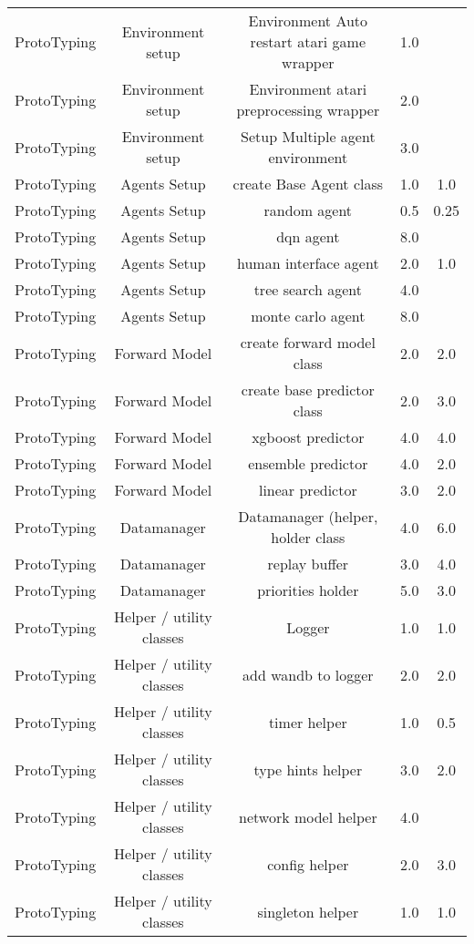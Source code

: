 \begin{longtable}{|c|c|c|c|c|}
	ProtoTyping & Environment setup & Environment Auto restart atari game wrapper & 1.0 &  \\
	ProtoTyping & Environment setup & Environment atari preprocessing wrapper & 2.0 &  \\
	ProtoTyping & Environment setup & Setup Multiple agent environment & 3.0 &  \\
	ProtoTyping & Agents Setup & create Base Agent class & 1.0 & 1.0 \\
	ProtoTyping & Agents Setup & random agent & 0.5 & 0.25 \\
	ProtoTyping & Agents Setup & dqn agent & 8.0 &  \\
	ProtoTyping & Agents Setup & human interface agent & 2.0 & 1.0 \\
	ProtoTyping & Agents Setup & tree search agent & 4.0 &  \\
	ProtoTyping & Agents Setup & monte carlo agent & 8.0 &  \\
	ProtoTyping & Forward Model & create forward model class & 2.0 & 2.0 \\
	ProtoTyping & Forward Model & create base predictor class & 2.0 & 3.0 \\
	ProtoTyping & Forward Model & xgboost predictor & 4.0 & 4.0 \\
	ProtoTyping & Forward Model & ensemble predictor & 4.0 & 2.0 \\
	ProtoTyping & Forward Model & linear predictor & 3.0 & 2.0 \\
	ProtoTyping & Datamanager & Datamanager (helper, holder class  & 4.0 & 6.0 \\
	ProtoTyping & Datamanager & replay buffer & 3.0 & 4.0 \\
	ProtoTyping & Datamanager & priorities holder & 5.0 & 3.0 \\
	ProtoTyping & Helper / utility classes & Logger & 1.0 & 1.0 \\
	ProtoTyping & Helper / utility classes & add wandb to logger & 2.0 & 2.0 \\
	ProtoTyping & Helper / utility classes & timer helper  & 1.0 & 0.5 \\
	ProtoTyping & Helper / utility classes & type hints helper & 3.0 & 2.0 \\
	ProtoTyping & Helper / utility classes & network model helper & 4.0 &  \\
	ProtoTyping & Helper / utility classes & config helper & 2.0 & 3.0 \\
	ProtoTyping & Helper / utility classes & singleton helper & 1.0 & 1.0 \\

\end{longtable}
